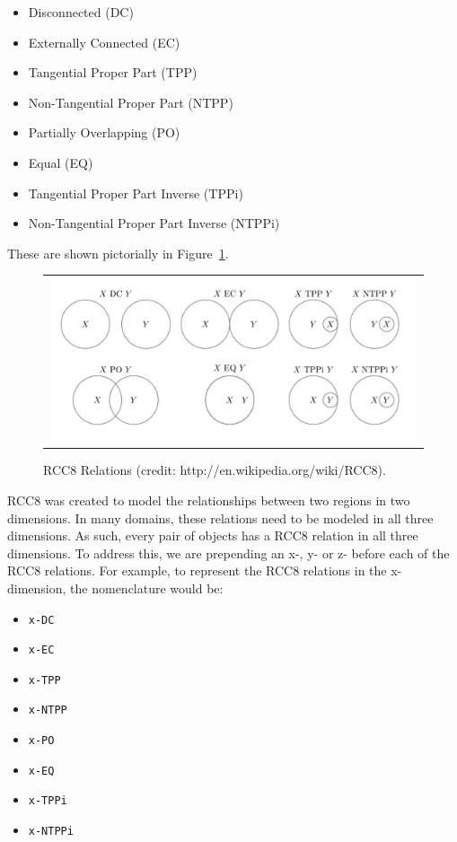 \documentclass[preprint,12pt]{elsarticle}
\newcommand{\rcc}[1] {\texttt{#1}}
\begin{document}
\begin{itemize}
  \item Disconnected (DC)
  \item Externally Connected (EC)
  \item Tangential Proper Part (TPP)
  \item Non-Tangential Proper Part (NTPP)
  \item Partially Overlapping (PO)
  \item Equal (EQ)
  \item Tangential Proper Part Inverse (TPPi)
  \item Non-Tangential Proper Part Inverse (NTPPi)
\end{itemize}

These are shown pictorially in Figure~\ref{fig:RCC8}.

\begin{figure}[h!t!]
\begin{center}
\begin{tabular}{c}
\includegraphics[width=12cm]{rcc8.pdf}
\end{tabular}
\end{center}
\caption{RCC8 Relations (credit: http://en.wikipedia.org/wiki/RCC8).}
\label{fig:RCC8}
\end{figure}

RCC8 was created to model the relationships between two regions in two dimensions. In many domains, these relations need to be modeled in all three dimensions. As such, every pair of objects has a RCC8 relation in all three dimensions. To address this, we are prepending an x-, y- or z- before each of the RCC8 relations. For example, to represent the RCC8 relations in the x-dimension, the nomenclature would be:
\begin{itemize}
  \item \rcc{x-DC}
  \item \rcc{x-EC}
  \item \rcc{x-TPP}
  \item \rcc{x-NTPP}
  \item \rcc{x-PO}
  \item \rcc{x-EQ}
  \item \rcc{x-TPPi}
  \item \rcc{x-NTPPi}
\end{itemize}
\end{document}
